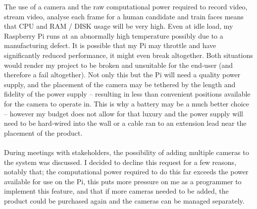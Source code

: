 \documentclass[9pt]{article}
\begin{document}
The use of a camera and the raw computational power required to record video, stream video, analyse each frame for a human candidate and train faces means that CPU and RAM / DISK usage will be very high. Even at idle load, my Raspberry Pi runs at an abnormally high temperature possibly due to a manufacturing defect. It is possible that my Pi may throttle and have significantly reduced performance, it might even break altogether. Both situations would render my project to be broken and unsuitable for the end-user (and therefore a fail altogether). Not only this but the Pi will need a quality power supply, and the placement of the camera may be tethered by the length and fidelity of the power supply – resulting in less than convenient positions available for the camera to operate in. This is why a battery may be a much better choice – however my budget does not allow for that luxury and the power supply will need to be hard-wired into the wall or a cable ran to an extension lead near the placement of the product.\\\\
During meetings with stakeholders, the possibility of adding multiple cameras to the system was discussed. I decided to decline this request for a few reasons, notably that; the computational power required to do this far exceeds the power available for use on the Pi, this puts more pressure on me as a programmer to implement this feature, and that if more cameras needed to be added, the product could be purchased again and the cameras can be managed separately.
\end{document}
